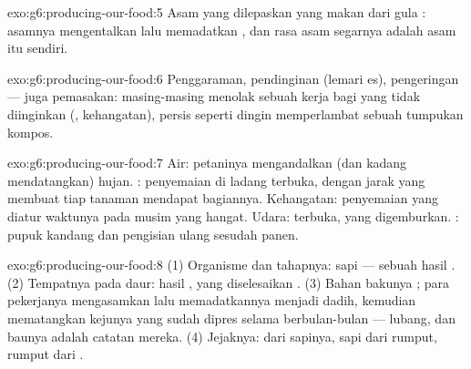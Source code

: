 \begin{solution}{exo:g6:producing-our-food:5}
Asam yang dilepaskan  yang makan dari gula : asamnya
mengentalkan lalu memadatkan , dan rasa asam segarnya adalah
asam itu sendiri.
\end{solution}

\begin{solution}{exo:g6:producing-our-food:6}
Penggaraman, pendinginan (lemari es), pengeringan --- juga pemasakan:
masing-masing menolak sebuah  kerja bagi  yang tidak
diinginkan (, kehangatan), persis seperti dingin
memperlambat sebuah tumpukan kompos.
\end{solution}

\begin{solution}{exo:g6:producing-our-food:7}
Air: petaninya mengandalkan (dan kadang mendatangkan) hujan. :
penyemaian di ladang terbuka, dengan jarak yang membuat tiap tanaman
mendapat bagiannya. Kehangatan: penyemaian yang diatur waktunya pada
musim yang hangat. Udara:  terbuka,  yang digemburkan. : pupuk kandang dan pengisian ulang sesudah panen.
\end{solution}

\begin{solution}{exo:g6:producing-our-food:8}
(1) Organisme dan tahapnya:  sapi --- sebuah hasil . (2)
Tempatnya pada daur: hasil , yang diselesaikan . (3)
Bahan bakunya ; para pekerjanya mengasamkan lalu memadatkannya
menjadi dadih, kemudian mematangkan kejunya yang sudah dipres selama
berbulan-bulan --- lubang,  dan baunya adalah catatan mereka. (4)
Jejaknya:  dari sapinya, sapi dari rumput, rumput dari .
\end{solution}

